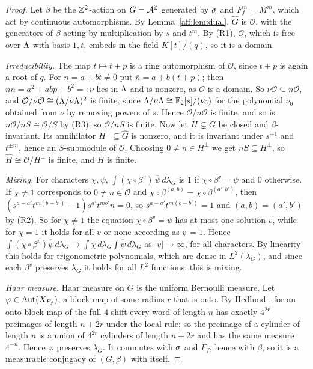 \begin{proof}
Let $\beta$ be the $\mathbb{Z}^2$-action on $G=\mathcal{A}^{\mathbb{Z}}$ generated by $\sigma$ and $F_f^m=M^m$, which act by continuous automorphisms. By Lemma~\ref{aff:lem:dual}, $\widehat G$ is $\mathcal O$, with the generators of $\beta$ acting by multiplication by $s$ and $t^m$. By (R1), $\mathcal O$, which is free over $\Lambda$ with basis $1,t$, embeds in the field $K[t]/(q)$, so it is a domain.

\emph{Irreducibility.} The map $t\mapsto t+p$ is a ring automorphism of $\mathcal O$, since $t+p$ is again a root of $q$. For $n=a+bt\ne0$ put $\bar n=a+b(t+p)$; then $n\bar n=a^2+abp+b^2=:\nu$ lies in $\Lambda$ and is nonzero, as $\mathcal O$ is a domain. So $\nu\mathcal O\subseteq n\mathcal O$, and $\mathcal O/\nu\mathcal O\cong(\Lambda/\nu\Lambda)^2$ is finite, since $\Lambda/\nu\Lambda\cong\mathbb{F}_2[s]/(\nu_0)$ for the polynomial $\nu_0$ obtained from $\nu$ by removing powers of $s$. Hence $\mathcal O/n\mathcal O$ is finite, and so is $n\mathcal O/nS\cong\mathcal O/S$ by (R3); so $\mathcal O/nS$ is finite. Now let $H\subsetneq G$ be closed and $\beta$-invariant. Its annihilator $H^\perp\subseteq\widehat G$ is nonzero, and it is invariant under $s^{\pm1}$ and $t^{\pm m}$, hence an $S$-submodule of $\mathcal O$. Choosing $0\ne n\in H^\perp$ we get $nS\subseteq H^\perp$, so $\widehat H\cong\mathcal O/H^\perp$ is finite, and $H$ is finite.

\emph{Mixing.} For characters $\chi,\psi$, $\int(\chi\circ\beta^v)\,\overline{\psi}\,d\lambda_G$ is $1$ if $\chi\circ\beta^v=\psi$ and $0$ otherwise. If $\chi\ne1$ corresponds to $0\ne n\in\mathcal O$ and $\chi\circ\beta^{(a,b)}=\chi\circ\beta^{(a',b')}$, then $(s^{a-a'}t^{m(b-b')}-1)s^{a'}t^{mb'}n=0$, so $s^{a-a'}t^{m(b-b')}=1$ and $(a,b)=(a',b')$ by (R2). So for $\chi\ne1$ the equation $\chi\circ\beta^v=\psi$ has at most one solution $v$, while for $\chi=1$ it holds for all $v$ or none according as $\psi=1$. Hence $\int(\chi\circ\beta^v)\overline\psi\,d\lambda_G\to\int\chi\,d\lambda_G\int\overline\psi\,d\lambda_G$ as $|v|\to\infty$, for all characters. By linearity this holds for trigonometric polynomials, which are dense in $L^2(\lambda_G)$, and since each $\beta^v$ preserves $\lambda_G$ it holds for all $L^2$ functions; this is mixing.

\emph{Haar measure.} Haar measure on $G$ is the uniform Bernoulli measure. Let $\varphi\in\operatorname{Aut}(X_{F_f})$, a block map of some radius $r$ that is onto. By Hedlund \cite[Theorem~5.4]{Hedlund1969}, for an onto block map of the full $4$-shift every word of length $n$ has exactly $4^{2r}$ preimages of length $n+2r$ under the local rule; so the preimage of a cylinder of length $n$ is a union of $4^{2r}$ cylinders of length $n+2r$ and has the same measure $4^{-n}$. Hence $\varphi$ preserves $\lambda_G$. It commutes with $\sigma$ and $F_f$, hence with $\beta$, so it is a measurable conjugacy of $(G,\beta)$ with itself.


\end{proof}
